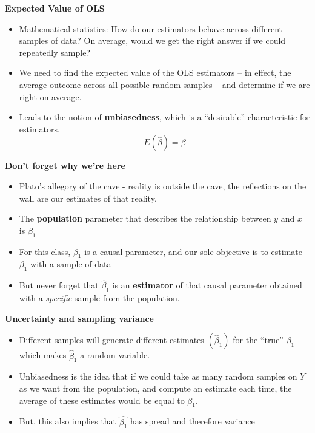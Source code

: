\documentclass[notes=show]{beamer}
\begin{document}
\begin{frame}[plain]
\textbf{Expected Value of OLS}
 \begin{itemize}
  \item Mathematical statistics: How do our estimators behave across different samples of data? On average, would we get the right answer if we could repeatedly sample?

  \item We need to find the expected value of the OLS estimators -- in effect, the average outcome across all possible random samples -- and determine if we are right on average.

  \item Leads to the notion of \textbf{unbiasedness}, which is a ``desirable'' characteristic for estimators.
  \begin{equation}
   E(\hat{\beta})=\beta
  \end{equation}
 \end{itemize}
\end{frame}

\begin{frame}[plain]
\begin{center}
\textbf{Don't forget why we're here}
\end{center}

 \begin{itemize}
  \item Plato's allegory of the cave - reality is outside the cave, the reflections on the wall are our estimates of that reality.
  \item The \textbf{population} parameter that describes the relationship between $y$ and $x$ is $\beta_1$
  \item For this class, $\beta_1$ is a causal parameter, and our sole objective is to estimate $\beta_{1}$ with a sample of data
  \item But never forget that $\hat{\beta}_{1}$ is an \textbf{estimator} of that causal parameter obtained with a \textit{specific} sample from the population.
 \end{itemize}
 
\end{frame}

\begin{frame}[plain]
\begin{center}
\textbf{Uncertainty and sampling variance}
\end{center}

\begin{itemize}
  \item Different samples will generate different estimates $(\hat{\beta}_{1})$ for the ``true'' $\beta_{1}$ which makes $\hat{\beta}_{1}$ a random variable.
  \item Unbiasedness is the idea that if we could take as many random samples on $Y$ as we want from the population, and compute an estimate each time, the average of these estimates would be equal to $\beta_{1}$.
  \item But, this also implies that $\hat{\beta_1}$ has spread and therefore variance
 \end{itemize}
\end{frame}
\end{document}
